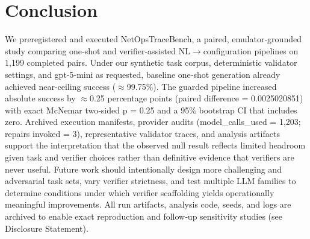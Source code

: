\documentclass[conference]{IEEEtran}
\begin{document}
\section{Conclusion}
We preregistered and executed NetOpsTraceBench, a paired, emulator‑grounded study comparing one‑shot and verifier‑assisted NL\ensuremath{\rightarrow}configuration pipelines on 1,199 completed pairs. Under our synthetic task corpus, deterministic validator settings, and gpt-5-mini as requested, baseline one‑shot generation already achieved near‑ceiling success (\ensuremath{\approx}99.75\%). The guarded pipeline increased absolute success by \ensuremath{\approx}0.25 percentage points (paired difference = 0.0025020851) with exact McNemar two‑sided p = 0.25 and a 95\% bootstrap CI that includes zero. Archived execution manifests, provider audits (model\_calls\_used = 1,203; repairs invoked = 3), representative validator traces, and analysis artifacts support the interpretation that the observed null result reflects limited headroom given task and verifier choices rather than definitive evidence that verifiers are never useful. Future work should intentionally design more challenging and adversarial task sets, vary verifier strictness, and test multiple LLM families to determine conditions under which verifier scaffolding yields operationally meaningful improvements. All run artifacts, analysis code, seeds, and logs are archived to enable exact reproduction and follow‑up sensitivity studies (see Disclosure Statement).
\end{document}
